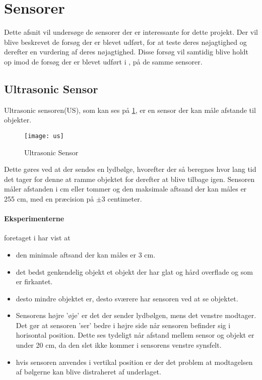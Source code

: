 \section{Sensorer}
Dette afsnit vil undersøge de sensorer der er interessante for dette projekt.
Der vil blive beskrevet de forsøg der er blevet udført, for at teste deres nøjagtighed og derefter en vurdering af deres nøjagtighed.
Disse forsøg vil samtidig blive holdt op imod de forsøg der er blevet udført i \cite{tikNXT}, på de samme sensorer.

\subsection{Ultrasonic Sensor}
Ultrasonic sensoren(US), som kan ses på \cref{sensor:ultrasonic_sensor}, er en sensor der kan måle afstande til objekter.

\begin{figure}[h]
\centering
\texttt{[image: us]}
\caption{\legoms Ultrasonic Sensor}
\label{sensor:ultrasonic_sensor}
\end{figure}

Dette gøres ved at der sendes en lydbølge, hvorefter der så beregnes hvor lang tid det tager for denne at ramme objektet for derefter at blive tilbage igen.
Sensoren måler afstanden i cm eller tommer og den maksimale aftsand der kan måles er 255 cm, med en præcision på $\pm$3 centimeter.\cite{tikNXT}

\paragraph{Eksperimenterne} foretaget i \cite{tikNXT} har vist at
\begin{itemize}
\item den minimale aftsand der kan måles er 3 cm.
\item det bedst genkendelig objekt et objekt der har glat og hård overflade og som er firkantet.
\item desto mindre objektet er, desto sværere har sensoren ved at se objektet.
\item Sensorens højre 'øje' er det der sender lydbølgen, mens det venstre modtager.
Det gør at sensoren 'ser' bedre i højre side når sensoren befinder sig i horisontal position.
Dette ses tydeligt når afstand mellem sensor og objekt er under 20 cm, da den slet ikke kommer i sensorens venstre synsfelt.
\item hvis sensoren anvendes i vertikal position er der det problem at modtagelsen af bølgerne kan blive distraheret af underlaget.
\end{itemize}


